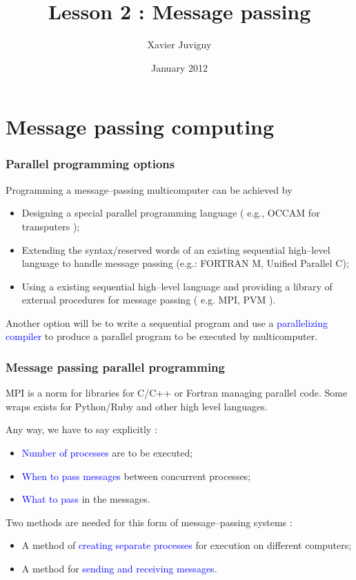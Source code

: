 \documentclass{beamer}
\title{Lesson 2 : Message passing}
\author[Juvigny]{Xavier Juvigny}
\institute{ONERA/HPC}
\date[C2013]{January 2012}
\begin{document}
\frame[plain]{\maketitle}

\section{Message passing computing}

\begin{frame}
\frametitle{Parallel programming options}

Programming a message--passing multicomputer can be achieved by
\begin{itemize}
\item Designing a {\color{blue}special} parallel programming language ( e.g., OCCAM for transputers );
\item {\color{blue} Extending} the syntax/reserved words of an existing sequential high--level
  language to handle message passing (e.g.: FORTRAN M, Unified Parallel C);
\item Using a existing sequential high--level language and providing a {\color{blue} library}
  of external procedures for message passing ( e.g. MPI, PVM ).
\end{itemize}

Another option will be to write a sequential program and use a \textcolor{blue}{parallelizing compiler}
to produce a parallel program to be executed by multicomputer.
\end{frame}

\begin{frame}
\frametitle{Message passing parallel programming}

MPI is a norm for libraries for C/C++ or Fortran managing parallel code. Some wraps exists for Python/Ruby and other
high level languages.

Any way, we have to say explicitly :
\begin{itemize}
\item \textcolor{blue}{Number of processes} are to be executed;
\item \textcolor{blue}{When to pass messages} between concurrent processes;
\item \textcolor{blue}{What to pass} in the messages.
\end{itemize}

Two methods are needed for this form of message--passing systems :
\begin{itemize}
\item A method of \textcolor{blue}{creating separate processes} for execution on different computers;
\item A method for \textcolor{blue}{sending and receiving messages}.
\end{itemize}

\end{frame}
\end{document}
